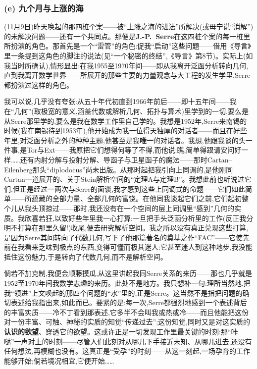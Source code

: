 \subsubsection*{(e) 九个月与上涨的海}
\label{ch18:local:h31}

\label{ch18:local:n27}

(11月9日)昨天唤起的那四桩个案——被“上涨之海的进法”所解决(或毋宁说“消解”)的未解决问题——还有一个共同点。那便是\textbf{J.-P.~Serre}在这四桩个案的每一桩里所扮演的角色。那首先是一个“雷管”的角色:促我“启动”这些问题——借用《导言》里一条提到这角色的脚注的说法(见“一个秘密的终结”,《导言》第8节)。实际上(如我当时所确认),情形显出:在我1955至1970年间——即从我离开泛函分析转向几何,直到我离开数学世界——所展开的那些主要的力量观念与大工程的发生学里,Serre都扮演过这样的角色。

我可以说,几乎没有夸张:从五十年代初直到1966年前后——即十五年间——我在“几何”(取极宽的意义,涵盖代数或解析几何、拓扑与算术)里学到的一切,要么是从Serre那里学的\dmark{},要么是我在数学工作里自己学的。我想是1952年,Serre来南锡的时候(我在南锡待到1953年),他开始成为我一位得天独厚的对话者——而且在好些年里,对泛函分析之外的种种主题,他甚至是我\textbf{唯一}的对话者。我想,他跟我谈的头一件事,是Tor与Ext——我原把它们想得何等了不得,而他说:瞧,简单得跟请安问好一样……还有内射分解与投射分解、导函子与卫星函子的魔法——那时Cartan--Eilenberg那头“diplodocus”尚未出版。从那时起把我引向上同调的,是他刚同Cartan一道展开的、关于Stein解析空间的“定理A与定理B”。我想此前也听说过它们,但正是经过一两次与Serre的面谈,我才感到这些上同调式的命题——它们如此简单——所蕴藏的全部力量、全部几何的富饶。在他同我谈起它们之前,它们起初整个儿从我头顶掠过——那时,我还没有在一个空间的层上同调里“感到”几何的实质。我欣喜若狂,以致好些年里我一心打算:一旦把手头泛函分析里的工作(反正我分明不打算在那里久留!)收尾,便去研究解析空间。我之所以没有真正兑现这些打算,是因为Serre其间转向了代数几何,写下了他那篇著名的奠基之作“FAC”——它使先前在我看来乏味到极点的东西,变得可懂而极其迷人:它甚至迷人到这种地步,我没能抵住这份魅力,于是转向了代数几何,而不是解析空间。

倘若不加克制,我便会顺藤摸瓜,从这里讲起我同Serre关系的来历——那也几乎就是1952至1970年间我数学志趣的来历。此处不是地方。我只想补一句:理所当然地,把我“领进”上文唤起的那四个问题的“水”里的,正是Serre。这当然不是指把问题的确切表述给我指出来,如此而已。要紧的是:每一次,Serre都强烈地感到一个表述背后的丰富实质——冷不丁看到那表述,它多半不会叫我或热或冷——而且他能把这份对一份丰富、可触、神秘的实质的知觉“传递过去”;这份知觉,同时又是对这实质的\textbf{认识的欲望}、穿透它的欲望。这或许正是一切发现工作里最关键的时刻:那“咔哒”一声对上的时刻\dmark{}——尽管人们此刻对从哪儿下手接近未知、从哪儿进去,还没有任何想法,再模糊也没有。这真正是“受孕”的时刻——从这一刻起,一场孕育的工作能够开始;倘若境况相宜,它便开始……

